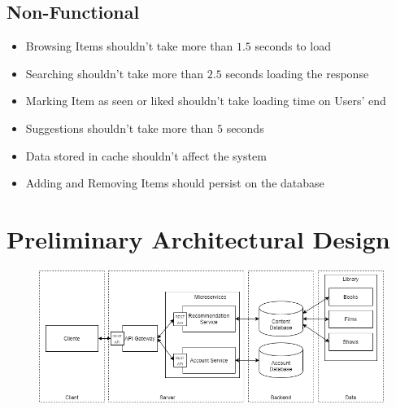 \documentclass{article}
\begin{document}
  \subsection{Non-Functional}
    \begin{itemize}
      \item Browsing Items shouldn't take more than $1.5$ seconds to load
      \item Searching shouldn't take more than $2.5$ seconds loading the response
      \item Marking Item as seen or liked shouldn't take loading time on Users' end
      \item Suggestions shouldn't take more than $5$ seconds
      \item Data stored in cache shouldn't affect the system
      \item Adding and Removing Items should persist on the database
    \end{itemize}

\section{Preliminary Architectural Design}
  \begin{figure}[H]
    \centering
    \includegraphics[width=\textwidth]{"images/CloudNativeAppArchitectureV1.png"}
  \end{figure}
\end{document}
